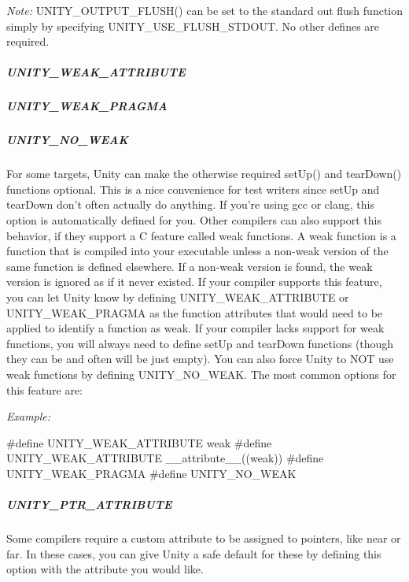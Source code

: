 {\itshape Note\+:} {\ttfamily U\+N\+I\+T\+Y\+\_\+\+O\+U\+T\+P\+U\+T\+\_\+\+F\+L\+U\+S\+H()} can be set to the standard out flush function simply by specifying {\ttfamily U\+N\+I\+T\+Y\+\_\+\+U\+S\+E\+\_\+\+F\+L\+U\+S\+H\+\_\+\+S\+T\+D\+O\+UT}. No other defines are required.

\subparagraph*{{\ttfamily U\+N\+I\+T\+Y\+\_\+\+W\+E\+A\+K\+\_\+\+A\+T\+T\+R\+I\+B\+U\+TE}}

\subparagraph*{{\ttfamily U\+N\+I\+T\+Y\+\_\+\+W\+E\+A\+K\+\_\+\+P\+R\+A\+G\+MA}}

\subparagraph*{{\ttfamily U\+N\+I\+T\+Y\+\_\+\+N\+O\+\_\+\+W\+E\+AK}}

For some targets, Unity can make the otherwise required set\+Up() and tear\+Down() functions optional. This is a nice convenience for test writers since set\+Up and tear\+Down don’t often actually do anything. If you’re using gcc or clang, this option is automatically defined for you. Other compilers can also support this behavior, if they support a C feature called weak functions. A weak function is a function that is compiled into your executable unless a non-\/weak version of the same function is defined elsewhere. If a non-\/weak version is found, the weak version is ignored as if it never existed. If your compiler supports this feature, you can let Unity know by defining U\+N\+I\+T\+Y\+\_\+\+W\+E\+A\+K\+\_\+\+A\+T\+T\+R\+I\+B\+U\+TE or U\+N\+I\+T\+Y\+\_\+\+W\+E\+A\+K\+\_\+\+P\+R\+A\+G\+MA as the function attributes that would need to be applied to identify a function as weak. If your compiler lacks support for weak functions, you will always need to define set\+Up and tear\+Down functions (though they can be and often will be just empty). You can also force Unity to N\+OT use weak functions by defining U\+N\+I\+T\+Y\+\_\+\+N\+O\+\_\+\+W\+E\+AK. The most common options for this feature are\+:

{\itshape Example\+:} 
\begin{DoxyCode}
\textcolor{preprocessor}{#define UNITY\_WEAK\_ATTRIBUTE weak}
\textcolor{preprocessor}{#define UNITY\_WEAK\_ATTRIBUTE \_\_attribute\_\_((weak))}
\textcolor{preprocessor}{#define UNITY\_WEAK\_PRAGMA}
\textcolor{preprocessor}{#define UNITY\_NO\_WEAK}
\end{DoxyCode}


\subparagraph*{{\ttfamily U\+N\+I\+T\+Y\+\_\+\+P\+T\+R\+\_\+\+A\+T\+T\+R\+I\+B\+U\+TE}}

Some compilers require a custom attribute to be assigned to pointers, like {\ttfamily near} or {\ttfamily far}. In these cases, you can give Unity a safe default for these by defining this option with the attribute you would like.

